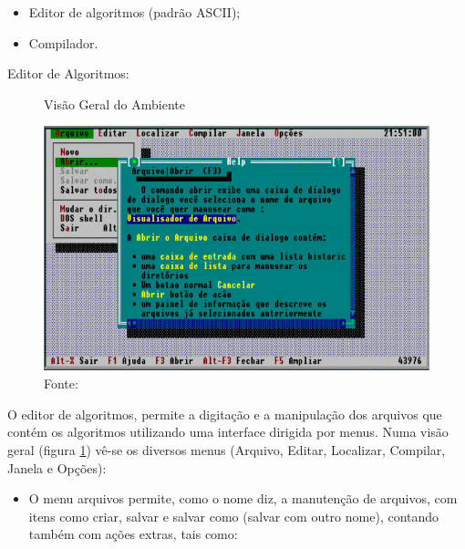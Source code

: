 \begin{itemize}
  \setlength\itemsep{0em}
  \item Editor de algoritmos (padrão ASCII);
  \item Compilador.
\end{itemize}

\begin{enumerate}
  {\bfseries\item Editor de Algoritmos:}

  \begin{figure}[h]
    \caption{Visão Geral do Ambiente}\label{fig:portugolplus-ambiente}
    \centering
    \includegraphics{figures/portugolplus-ambiente.pdf}
    \caption*{\footnotesize Fonte: }
  \end{figure}

O editor de algoritmos, permite a digitação e a manipulação dos arquivos que
contém os algoritmos utilizando uma interface dirigida por menus. Numa visão
geral (figura \ref{fig:portugolplus-ambiente}) vê-se os diversos menus (Arquivo,
Editar, Localizar, Compilar, Janela e Opções):

\begin{itemize}

  \item O menu arquivos permite, como o nome diz, a manutenção de arquivos, com
  itens como criar, salvar e salvar como (salvar com outro nome), contando também
  com ações extras, tais como:


\end{itemize}
\end{enumerate}
